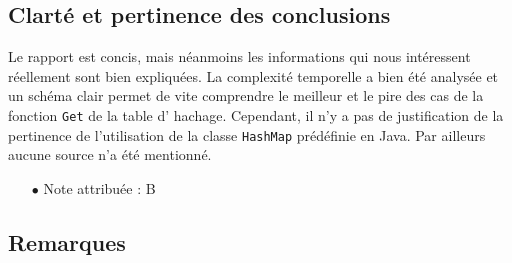 \documentclass[11pt]{article}
\begin{document}
\subsection{Clarté et pertinence des conclusions}

Le rapport est concis, mais néanmoins les informations qui nous intéressent réellement sont bien expliquées. La complexité temporelle a bien été analysée et un schéma clair permet de vite comprendre le meilleur et le pire des cas de la fonction \verb+Get+ de la table d' hachage. Cependant, il n'y a pas de justification de la pertinence de l'utilisation de la classe \verb+HashMap+ prédéfinie en Java. Par ailleurs aucune source n'a été mentionné.
\\
\begin{itemize}
\item[$\bullet$] Note attribuée : B
\end{itemize}

  
\subsection{Remarques}
\end{document}
